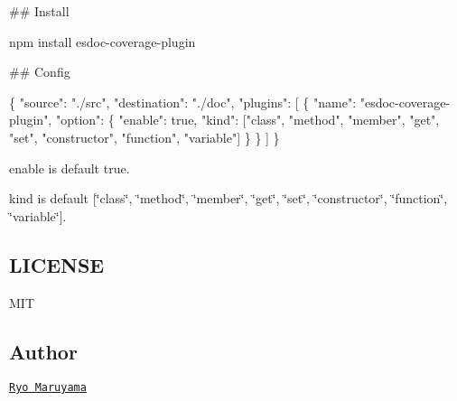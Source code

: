 \#\# Install 
\begin{DoxyCode}
npm install esdoc-coverage-plugin
\end{DoxyCode}


\#\# Config 
\begin{DoxyCode}
\{
  "source": "./src",
  "destination": "./doc",
  "plugins": [
    \{
      "name": "esdoc-coverage-plugin", 
      "option": \{
        "enable": true,
        "kind": ["class", "method", "member", "get", "set", "constructor", "function", "variable"]
      \}
    \}
  ]
\}
\end{DoxyCode}


{\ttfamily enable} is default {\ttfamily true}.

{\ttfamily kind} is default {\ttfamily \mbox{[}\char`\"{}class\char`\"{}, \char`\"{}method\char`\"{}, \char`\"{}member\char`\"{}, \char`\"{}get\char`\"{}, \char`\"{}set\char`\"{}, \char`\"{}constructor\char`\"{}, \char`\"{}function\char`\"{}, \char`\"{}variable\char`\"{}\mbox{]}}.

\subsection*{L\+I\+C\+E\+N\+SE}

M\+IT

\subsection*{Author}

\href{https://github.com/h13i32maru}{\tt Ryo Maruyama} 